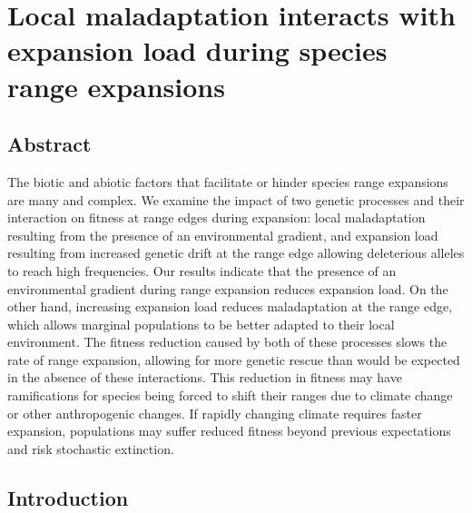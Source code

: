 \chapter{Local maladaptation interacts with expansion load during species range expansions}
\label{chap:expansionload}

\section*{Abstract}

The biotic and abiotic factors that facilitate or hinder species range expansions are many and complex. We examine the impact of two genetic processes and their interaction on fitness at range edges during expansion: local maladaptation resulting from the presence of an environmental gradient, and expansion load resulting from increased genetic drift at the range edge allowing deleterious alleles to reach high frequencies. Our results indicate that the presence of an environmental gradient during range expansion reduces expansion load. On the other hand, increasing expansion load reduces maladaptation at the range edge, which allows marginal populations to be better adapted to their local environment. The fitness reduction caused by both of these processes slows the rate of range expansion, allowing for more genetic rescue than would be expected in the absence of these interactions. This reduction in fitness may have ramifications for species being forced to shift their ranges due to climate change or other anthropogenic changes. If rapidly changing climate requires faster expansion, populations may suffer reduced fitness beyond previous expectations and risk stochastic extinction.

\newpage{}



\section*{Introduction}

